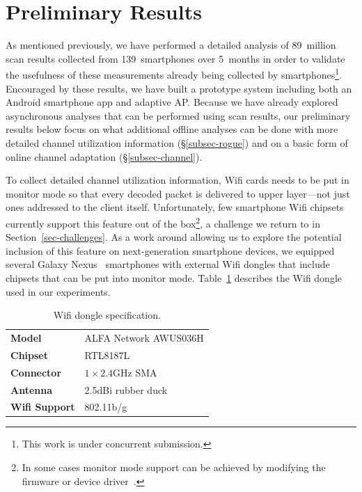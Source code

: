 \section{Preliminary Results}
\label{sec-results}

As mentioned previously, we have performed a detailed analysis of 89~million
scan results collected from 139~smartphones over 5~months in order to
validate the usefulness of these measurements already being collected by
smartphones\footnote{This work is under concurrent submission.}. Encouraged
by these results, we have built a prototype \PS{} system including both
an Android smartphone app and adaptive AP. Because we have already explored
asynchronous analyses that can be performed using scan results, our
preliminary results below focus on what additional offline analyses can be
done with more detailed channel utilization information
(\S\ref{subsec-rogue}) and on a basic form of online channel adaptation
(\S\ref{subsec-channel}).

To collect detailed channel utilization information, Wifi cards needs to be
put in monitor mode so that every decoded packet is delivered to upper
layer---not just ones addressed to the client itself. Unfortunately, few
smartphone Wifi chipsets currently support this feature out of the
box\footnote{In some cases monitor mode support can be achieved by modifying
the firmware or device driver~\cite{bmon}.}, a challenge we return to in
Section~\ref{sec-challenges}. As a work around allowing us to explore the
potential inclusion of this feature on next-generation smartphone devices, we
equipped several Galaxy Nexus~\cite{galaxynexus} smartphones with external
Wifi dongles that include chipsets that can be put into monitor mode.
Table~\ref{tab:dongle} describes the Wifi dongle used in our experiments.

\begin{table}[t!]
  \centering
  \begin{tabular}{ll}
    \toprule
    \textbf{Model} & ALFA Network AWUS036H \\
    \textbf{Chipset} & RTL8187L \\
    \textbf{Connector} & $1\times2.4$GHz SMA \\
    \textbf{Antenna} & 2.5dBi rubber duck \\
    \textbf{Wifi Support} & 802.11b/g \\
    \bottomrule
  \end{tabular}
  \caption{Wifi dongle specification.}
  \label{tab:dongle}
\end{table}



